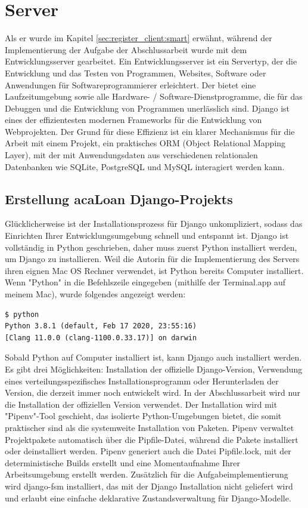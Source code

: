 \section{Server}
\label{sec:server}
Als er wurde im Kapitel \ref{sec:register_client:smart} erwähnt, während der Implementierung der Aufgabe der Abschlussarbeit wurde mit dem Entwicklungsserver gearbeitet. Ein Entwicklungsserver ist ein Servertyp, der die Entwicklung und das Testen von Programmen, Websites, Software oder Anwendungen für Softwareprogrammierer erleichtert. Der bietet eine Laufzeitumgebung sowie alle Hardware- / Software-Dienstprogramme, die für das Debuggen und die Entwicklung von Programmen unerlässlich sind. Django ist eines der effizientesten modernen Frameworks für die Entwicklung von Webprojekten. Der Grund für diese Effizienz ist ein klarer Mechanismus für die Arbeit mit einem Projekt, ein praktisches ORM (Object Relational Mapping Layer), mit der mit Anwendungsdaten aus verschiedenen relationalen Datenbanken wie SQLite, PostgreSQL und MySQL interagiert werden kann.

\subsection{Erstellung acaLoan Django-Projekts}
\label{sec:server:install}
Glücklicherweise ist der Installationsprozess für Django unkompliziert, sodass das Einrichten Ihrer Entwicklungsumgebung schnell und entspannt ist. Django ist vollständig in Python geschrieben, daher muss zuerst Python installiert werden, um Django zu installieren. Weil die Autorin für die Implementierung des Servers ihren eignen Mac OS Rechner verwendet, ist Python bereits Computer installiert. Wenn "Python" in die Befehlszeile eingegeben (mithilfe der Terminal.app auf meinem Mac), wurde folgendes angezeigt werden:
\begin{lstlisting}
$ python
Python 3.8.1 (default, Feb 17 2020, 23:55:16) 
[Clang 11.0.0 (clang-1100.0.33.17)] on darwin
\end{lstlisting}

Sobald Python auf Computer installiert ist, kann Django auch installiert werden. Es gibt drei Möglichkeiten: Installation der offizielle Django-Version, Verwendung eines verteilungsspezifisches Installationsprogramm oder Herunterladen der Version, die derzeit immer noch entwickelt wird. In der Abschlussarbeit wird nur die Installation der offiziellen Version verwendet. Der Installation wird mit "Pipenv"-Tool geschieht, das isolierte Python-Umgebungen bietet, die somit praktischer sind als die systemweite Installation von Paketen. Pipenv verwaltet Projektpakete automatisch über die Pipfile-Datei, während die Pakete installiert oder deinstalliert werden. Pipenv generiert auch die Datei Pipfile.lock, mit der deterministische Builds erstellt und eine Momentaufnahme Ihrer Arbeitsumgebung erstellt werden. Zusätzlich für die Aufgabeimplementierung wird django-fsm installiert, das mit der Django Installation nicht geliefert wird und erlaubt eine einfache deklarative Zustandsverwaltung für Django-Modelle. 

